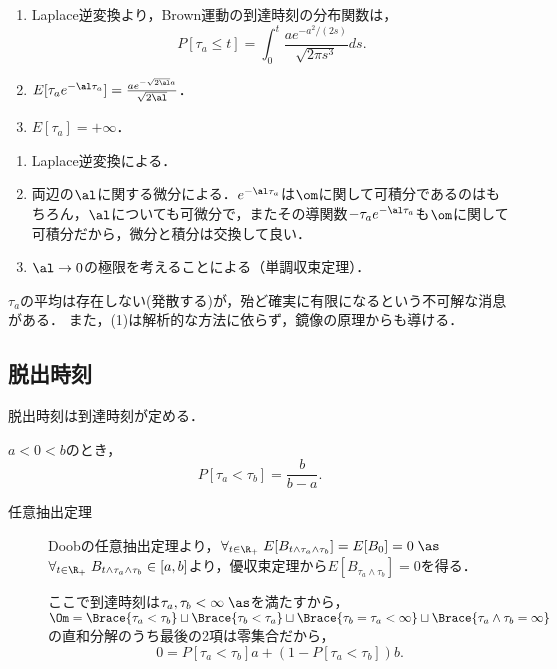 \documentclass[uplatex,dvipdfmx]{jsreport}
\begin{document}
\begin{corollary}[到達時刻の分布]\mbox{}\label{cor-density-of-Brownian-hitting-time}
    \begin{enumerate}
        \item Laplace逆変換より，Brown運動の到達時刻の分布関数は，
        \[P[\tau_a\le t]=\int^t_0\frac{ae^{-a^2/(2s)}}{\sqrt{2\pi s^3}}ds.\]
        \item $E[\tau_ae^{-\al\tau_a}]=\frac{ae^{-\sqrt{2\al}a}}{\sqrt{2\al}}$．
        \item $E[\tau_a]=+\infty$．
    \end{enumerate}
\end{corollary}
\begin{Proof}\mbox{}
    \begin{enumerate}
        \item Laplace逆変換による．
        \item 両辺の$\al$に関する微分による．$e^{-\al\tau_a}$は$\om$に関して可積分であるのはもちろん，$\al$についても可微分で，またその導関数$-\tau_ae^{-\al\tau_a}$も$\om$に関して可積分だから，微分と積分は交換して良い．
        \item $\al\to0$の極限を考えることによる（単調収束定理）．
    \end{enumerate}
\end{Proof}
\begin{remarks}
    $\tau_a$の平均は存在しない(発散する)が，殆ど確実に有限になるという不可解な消息がある．
    また，(1)は解析的な方法に依らず，鏡像の原理からも導ける．
\end{remarks}

\subsection{脱出時刻}

\begin{tcolorbox}[colframe=ForestGreen, colback=ForestGreen!10!white,breakable,colbacktitle=ForestGreen!40!white,coltitle=black,fonttitle=\bfseries\sffamily,
title=]
    脱出時刻は到達時刻が定める．
\end{tcolorbox}

\begin{proposition}[どっちの端から脱出するかの確率]
    $a<0<b$のとき，
    \[P[\tau_a<\tau_b]=\frac{b}{b-a}.\]
\end{proposition}
\begin{Proof}\mbox{}
    \begin{description}
        \item[任意抽出定理] Doobの任意抽出定理より，$\forall_{t\in\R_+}\;E[B_{t\land\tau_a\land\tau_b}]=E[B_0]=0\;\as$
        $\forall_{t\in\R_+}\;B_{t\land\tau_a\land\tau_b}\in[a,b]$より，優収束定理から$E[B_{\tau_a\land\tau_b}]=0$を得る．

        ここで到達時刻は$\tau_a,\tau_b<\infty\;\as$を満たすから，$\Om=\Brace{\tau_a<\tau_b}\sqcup\Brace{\tau_b<\tau_a}\sqcup\Brace{\tau_b=\tau_a<\infty}\sqcup\Brace{\tau_a\land\tau_b=\infty}$の直和分解のうち最後の2項は零集合だから，
        \[0=P[\tau_a<\tau_b]a+(1-P[\tau_a<\tau_b])b.\]
    \end{description}
\end{Proof}
\end{document}
